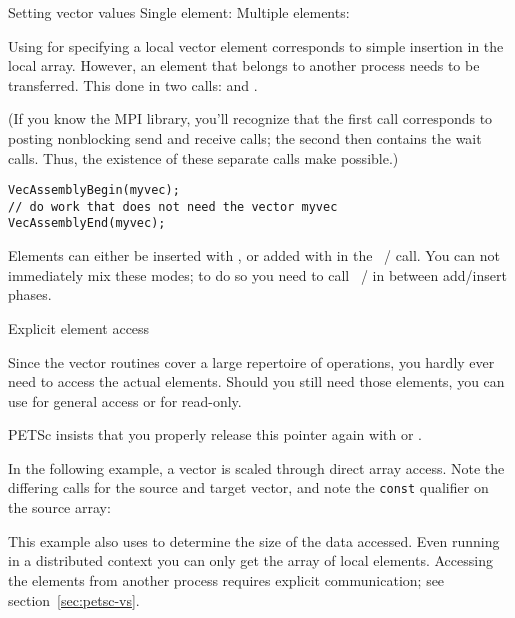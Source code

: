 \begin{pythonnote}{Setting vector values}
  Single element:
  Multiple elements:
\end{pythonnote}

Using  for specifying a local vector element
corresponds to simple insertion in the local array. However,
an element that belongs to another process needs to be
transferred. This done in two calls: 
and .


(If you know the MPI library, you'll recognize that the first call corresponds to
posting nonblocking send and receive calls; the second then contains
the wait calls. Thus, the existence of these separate calls make
 possible.)

\begin{lstlisting}
VecAssemblyBegin(myvec);
// do work that does not need the vector myvec
VecAssemblyEnd(myvec);
\end{lstlisting}

Elements can either be inserted
with ,
or added with  in the
~/  call.
You can not immediately mix these modes; to do so you need to call
~/ 
in between add/insert phases.

 {Explicit element access}

Since the vector routines cover a large repertoire of operations, you
hardly ever need to access the actual elements. Should you still need
those elements, you can use  for general
access or  for read-only.

PETSc insists that you properly release this pointer again with
 or
.

In the following example, a vector is scaled through direct array access.
Note the differing calls for the source and target vector,
and note the \lstinline{const} qualifier on the source array:
%

This example also uses 
to determine the size of the data accessed.
Even running in a distributed context you can only get the array
of local elements.
Accessing the elements from another process
requires explicit communication; see section~\ref{sec:petsc-vs}.


